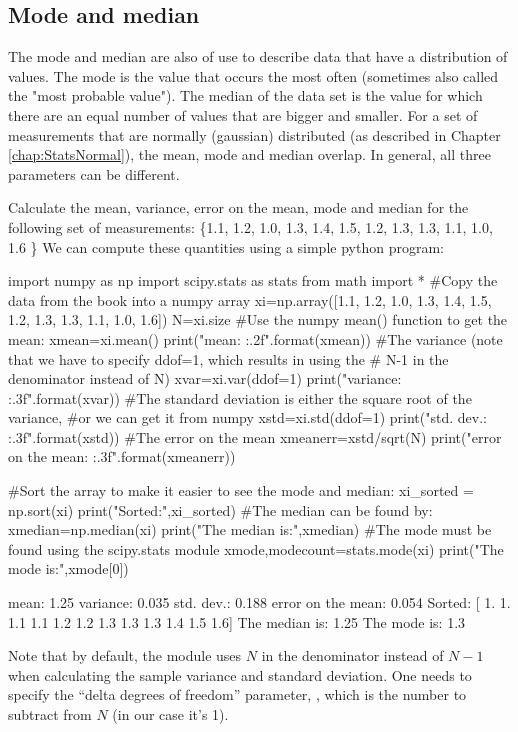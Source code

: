 \subsection{Mode and median}

The mode and median are also of use to describe data that have a distribution of values. The mode is the value that occurs the most often (sometimes also called the "most probable value"). The median of the data set is the value for which there are an equal number of values that are bigger and smaller. For a set of measurements that are normally (gaussian) distributed (as described in Chapter \ref{chap:StatsNormal}), the mean, mode and median overlap. In general, all three parameters can be different. 

\begin{example}{Calculate the mean, variance, error on the mean, mode and median for the following set of measurements: \{1.1, 1.2, 1.0, 1.3, 1.4, 1.5, 1.2, 1.3, 1.3, 1.1, 1.0, 1.6 \}}
\label{ex:meanvardata}
We can compute these quantities using a simple python program:
\begin{python}[caption = Basic statistical quantities]
import numpy as np
import scipy.stats as stats
from math import *
#Copy the data from the book into a numpy array
xi=np.array([1.1, 1.2, 1.0, 1.3, 1.4, 1.5, 1.2, 1.3, 1.3, 1.1, 1.0, 1.6])
N=xi.size
#Use the numpy mean() function to get the mean:
xmean=xi.mean()
print("mean: {:.2f}".format(xmean))
#The variance (note that we have to specify ddof=1, which results in using the 
# N-1 in the denominator instead of N)
xvar=xi.var(ddof=1)
print("variance: {:.3f}".format(xvar))
#The standard deviation is either the square root of the variance,
#or we can get it from numpy
xstd=xi.std(ddof=1)
print("std. dev.: {:.3f}".format(xstd))
#The error on the mean
xmeanerr=xstd/sqrt(N)
print("error on the mean: {:.3f}".format(xmeanerr))

#Sort the array to make it easier to see the mode and median:
xi_sorted = np.sort(xi)
print("Sorted:",xi_sorted)
#The median can be found by:
xmedian=np.median(xi)
print("The median is:",xmedian)
#The mode must be found using the scipy.stats module
xmode,modecount=stats.mode(xi)
print("The mode is:",xmode[0])
\end{python}
\begin{poutput}
mean: 1.25
variance: 0.035
std. dev.: 0.188
error on the mean: 0.054
Sorted: [ 1.   1.   1.1  1.1  1.2  1.2  1.3  1.3  1.3  1.4  1.5  1.6]
The median is: 1.25
The mode is: 1.3
\end{poutput}

Note that by default, the  module uses $N$ in the denominator instead of $N-1$ when calculating the sample variance and standard deviation. One needs to specify the ``delta degrees of freedom'' parameter, , which is the number to subtract from $N$ (in our case it's 1).

\end{example}

